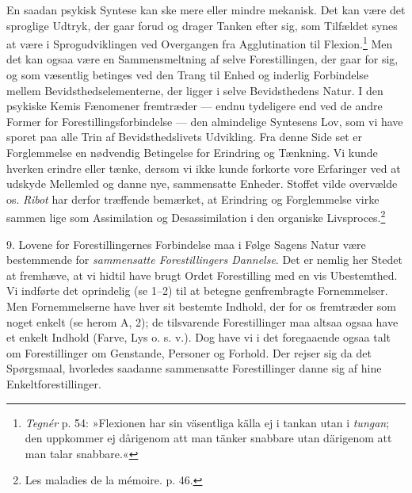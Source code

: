 \documentclass[12pt,a4paper,openany]{book}
\begin{document}
En saadan psykisk Syntese kan ske mere eller mindre mekanisk. Det kan
være det sproglige Udtryk, der gaar forud og drager Tanken efter sig,
som Tilfældet synes at være i Sprogudviklingen ved Overgangen fra
Agglutination til Flexion.\footnote[1]{\emph{Tegnér} p. 54: »Flexionen
har sin väsentliga källa ej i tankan utan i \emph{tungan}; den uppkommer
ej dårigenom att man tänker snabbare utan därigenom att man talar
snabbare.«} Men det kan ogsaa være en Sammensmeltning af selve
Forestillingen, der gaar for sig, og som væsentlig betinges ved den
Trang til Enhed og inderlig Forbindelse mellem Bevidsthedselementerne,
der ligger i selve Bevidsthedens Natur. I den psykiske Kemis Fænomener
fremtræder --- endnu tydeligere end ved de andre Former for
Forestillingsforbindelse --- den almindelige Syntesens Lov, som vi have
sporet paa alle Trin af Bevidsthedslivets Udvikling. Fra denne Side set
er Forglemmelse en nødvendig Betingelse for Erindring og Tænkning. Vi
kunde hverken erindre eller tænke, dersom vi ikke kunde forkorte vore
Erfaringer ved at udskyde Mellemled og danne nye, sammensatte Enheder.
Stoffet vilde overvælde os. \emph{Ribot} har derfor træffende bemærket,
at Erindring og Forglemmelse virke sammen lige som Assimilation og
Desassimilation i den organiske Livsproces.\footnote[2]{Les maladies de
la mémoire. p. 46.}

9. Lovene for Forestillingernes Forbindelse maa i Følge Sagens Natur
være bestemmende for \emph{sammensatte Forestillingers Dannelse}. Det er
nemlig her Stedet at fremhæve, at vi hidtil have brugt Ordet
Forestilling med en vis Ubestemthed. Vi indførte det oprindelig (se 1--2)
til at betegne genfrembragte Fornemmelser. Men Fornemmelserne have hver
sit bestemte Indhold, der for os fremtræder som noget enkelt (se herom
A, 2); de tilsvarende Forestillinger maa altsaa ogsaa have et enkelt
Indhold (Farve, Lys o. s. v.). Dog have vi i det foregaaende ogsaa talt
om Forestillinger om Genstande, Personer og Forhold. Der rejser sig da
det Spørgsmaal, hvorledes saadanne sammensatte Forestillinger danne sig
af hine Enkeltforestillinger.
\end{document}
